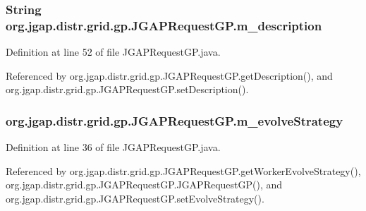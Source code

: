 \hypertarget{classorg_1_1jgap_1_1distr_1_1grid_1_1gp_1_1_j_g_a_p_request_g_p_a2f4fc93b15617d582c175418b4ec3ed5}{
\subsubsection[{m\-\_\-description}]{\setlength{\rightskip}{0pt plus 5cm}String org.\-jgap.\-distr.\-grid.\-gp.\-J\-G\-A\-P\-Request\-G\-P.\-m\-\_\-description\hspace{0.3cm}{\ttfamily [private]}}}\label{classorg_1_1jgap_1_1distr_1_1grid_1_1gp_1_1_j_g_a_p_request_g_p_a2f4fc93b15617d582c175418b4ec3ed5}


Definition at line 52 of file J\-G\-A\-P\-Request\-G\-P.\-java.



Referenced by org.\-jgap.\-distr.\-grid.\-gp.\-J\-G\-A\-P\-Request\-G\-P.\-get\-Description(), and org.\-jgap.\-distr.\-grid.\-gp.\-J\-G\-A\-P\-Request\-G\-P.\-set\-Description().

\hypertarget{classorg_1_1jgap_1_1distr_1_1grid_1_1gp_1_1_j_g_a_p_request_g_p_a88f1eedbcbaffbbe37826ea3981363b2}{
\subsubsection[{m\-\_\-evolve\-Strategy}]{ org.\-jgap.\-distr.\-grid.\-gp.\-J\-G\-A\-P\-Request\-G\-P.\-m\-\_\-evolve\-Strategy\hspace{0.3cm}{\ttfamily [private]}}}\label{classorg_1_1jgap_1_1distr_1_1grid_1_1gp_1_1_j_g_a_p_request_g_p_a88f1eedbcbaffbbe37826ea3981363b2}


Definition at line 36 of file J\-G\-A\-P\-Request\-G\-P.\-java.



Referenced by org.\-jgap.\-distr.\-grid.\-gp.\-J\-G\-A\-P\-Request\-G\-P.\-get\-Worker\-Evolve\-Strategy(), org.\-jgap.\-distr.\-grid.\-gp.\-J\-G\-A\-P\-Request\-G\-P.\-J\-G\-A\-P\-Request\-G\-P(), and org.\-jgap.\-distr.\-grid.\-gp.\-J\-G\-A\-P\-Request\-G\-P.\-set\-Evolve\-Strategy().


